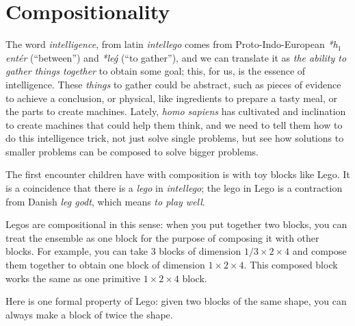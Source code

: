 

\section{Compositionality}

The word \emph{intelligence}, from latin \emph{intellego} comes from Proto-Indo-European  \emph{*h${}_1$entér} (``between'') and \emph{*leǵ} (``to gather''), and we can translate it as \emph{the ability to gather things together} to obtain some goal; this, for us, is the essence of intelligence. These \emph{things} to gather could be abstract, such as pieces of evidence to achieve a conclusion, or physical, like ingredients to prepare a tasty meal, or the parts to create machines. Lately, \emph{homo sapiens} has cultivated and inclination to create machines that could help them think, and we need to tell them how to do this intelligence trick, not just solve single problems, but see how solutions to smaller problems can be composed to solve bigger problems.

The first encounter children have with composition is with toy blocks like Lego. It is a coincidence that there is a \emph{lego} in \emph{intellego}; the lego in Lego is a contraction from Danish \emph{leg godt}, which means \emph{to play well}.

Legos are compositional in this sense: when you put together two blocks, you can treat the ensemble as one block for the purpose of composing it with other blocks. For example, you can take 3 blocks of dimension $1/3 \times 2 \times 4$ and compose them together to obtain one block of dimension $1 \times 2 \times 4$. This composed block works the same as one primitive  $1 \times 2 \times 4 $ block.

\hfill
{}
\hfill
{}
\hfill



Here is one formal property of Lego: given two blocks of the same shape, you can always make a block of twice the shape.

